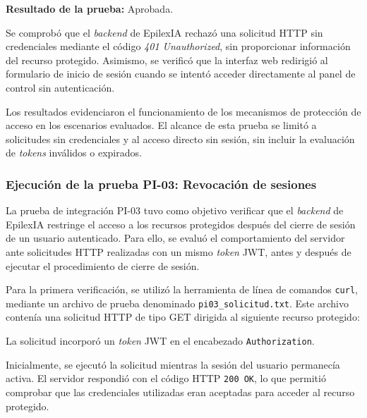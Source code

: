 \FloatBarrier

\noindent\textbf{Resultado de la prueba:} Aprobada.

Se comprobó que el \textit{backend} de EpilexIA rechazó una solicitud HTTP sin credenciales mediante el código \textit{401 Unauthorized}, sin proporcionar información del recurso protegido. Asimismo, se verificó que la interfaz web redirigió al formulario de inicio de sesión cuando se intentó acceder directamente al panel de control sin autenticación.

Los resultados evidenciaron el funcionamiento de los mecanismos de protección de acceso en los escenarios evaluados. El alcance de esta prueba se limitó a solicitudes sin credenciales y al acceso directo sin sesión, sin incluir la evaluación de \textit{tokens} inválidos o expirados.



\subsubsection[Ejecución de PI-03: Revocación de sesiones]{Ejecución de la prueba PI-03: Revocación de sesiones}

La prueba de integración PI-03 tuvo como objetivo verificar que el \textit{backend} de EpilexIA restringe el acceso a los recursos protegidos después del cierre de sesión de un usuario autenticado. Para ello, se evaluó el comportamiento del servidor ante solicitudes HTTP realizadas con un mismo \textit{token} JWT, antes y después de ejecutar el procedimiento de cierre de sesión.



Para la primera verificación, se utilizó la herramienta
de línea de comandos \texttt{curl}, mediante un archivo
de prueba denominado \texttt{pi03\_solicitud.txt}.
Este archivo contenía una solicitud HTTP de tipo GET
dirigida al siguiente recurso protegido:

\begin{center}
\end{center}

La solicitud incorporó un \textit{token} JWT en el encabezado
\texttt{Authorization}.


Inicialmente, se ejecutó la solicitud mientras la sesión del usuario permanecía activa. El servidor respondió con el código HTTP \texttt{200 OK}, lo que permitió comprobar que las credenciales utilizadas eran aceptadas para acceder al recurso protegido.

